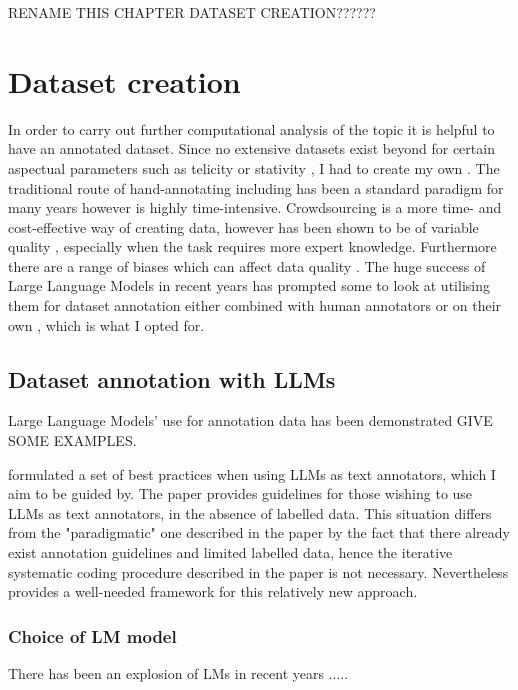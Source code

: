 
RENAME THIS CHAPTER DATASET CREATION??????

\section{Dataset creation}
\label{sec:dataset_creation}
In order to carry out further computational analysis of the topic it is helpful to have an annotated dataset. Since no extensive datasets exist beyond for certain aspectual parameters such as telicity \citep{friedrich-gateva-2017-classification} or stativity \citep{Friedrich2014AutomaticPO}, I had to create my own \citep{friedrich-etal-2023-kind}. The traditional route of hand-annotating including has been a standard paradigm for many years however is highly time-intensive. Crowdsourcing is a more time- and cost-effective way of creating data, however has been shown to be of variable quality \citep{li2024comparative}, especially when the task requires more expert knowledge. Furthermore there are a range of biases which can affect data quality \citep{Beck2023}. The huge success of Large Language Models in recent years has prompted some to look at utilising them for dataset annotation either combined with human annotators \citep{goel2023llms} or on their own \citep{he2023annollm, llmsForPragAndDiscAnalysis, Gilardi_2023}, which is what I opted for.

\subsection{Dataset annotation with LLMs}
Large Language Models' use for annotation data has been demonstrated GIVE SOME EXAMPLES.  

\citet{törnberg2024best} formulated a set of best practices when using LLMs as text annotators, which I aim to be guided by. The paper provides guidelines for those wishing to use LLMs as text annotators, in the absence of labelled data. This situation differs from the "paradigmatic" one described in the paper by the fact that there already exist annotation guidelines and limited labelled data, hence the iterative systematic coding procedure described in the paper is not necessary. Nevertheless \citet{törnberg2024best} provides a well-needed framework for this relatively new approach. 

\subsubsection*{Choice of LM model}
There has been an explosion of LMs in recent years .....

